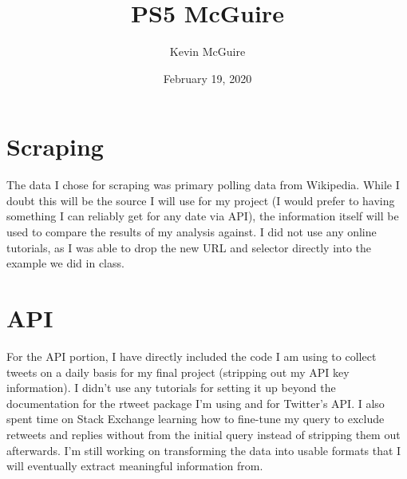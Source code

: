 \documentclass{article}
\title{PS5 McGuire}
\author{Kevin McGuire}
\date{February 19, 2020}
\begin{document}
\maketitle

\section{Scraping}
The data I chose for scraping was primary polling data from Wikipedia. While I doubt this will be the source I will use for my project (I would prefer to having something I can reliably get for any date via API), the information itself will be used to compare the results of my analysis against. I did not use any online tutorials, as I was able to drop the new URL and selector directly into the example we did in class.

\section{API}
For the API portion, I have directly included the code I am using to collect tweets on a daily basis for my final project (stripping out my API key information). I didn't use any tutorials for setting it up beyond the documentation for the rtweet package I'm using and for Twitter's API. I also spent time on Stack Exchange learning how to fine-tune my query to exclude retweets and replies without from the initial query instead of stripping them out afterwards. I'm still working on transforming the data into usable formats that I will eventually extract meaningful information from.
\end{document}

